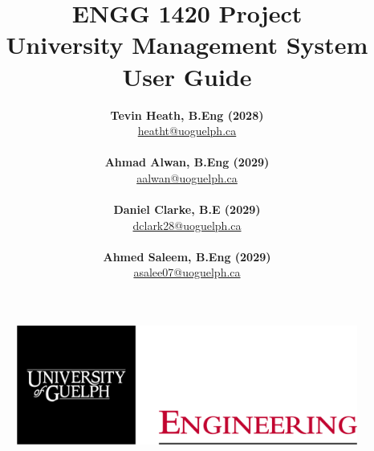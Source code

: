 \documentclass[12pt]{article}
\begin{document}
\title{\textbf{ENGG 1420 Project} \\ University Management System \\ User Guide} %
\author{\textbf{Tevin Heath, B.Eng (2028)}\\ \href{mailto:heatht@uoguelph.ca}{heatht@uoguelph.ca} \\\\  \textbf{Ahmad Alwan, B.Eng (2029)}\\ \href{mailto:aalwan@uoguelph.ca}{aalwan@uoguelph.ca} \\\\  \textbf{Daniel Clarke, B.E (2029)}\\\href{mailto:dclark28@uoguelph.ca}{dclark28@uoguelph.ca} \\\\  \textbf{Ahmed Saleem, B.Eng (2029)}\\ \href{mailto:asalee07@uoguelph.ca}{asalee07@uoguelph.ca} }
\maketitle %
\thispagestyle{empty}

\begin{figure}[H] %
    \centering
    \includegraphics[width=0.5\linewidth]{figures/SOE Lockup WEB - LARGE - transparent bkgd - RED ENG.png}
    \label{fig:enter-label}
\end{figure}

\vspace{2mm} %



\newpage
\tableofcontents


\end{document}
